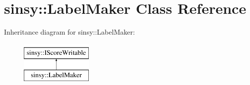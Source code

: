 \hypertarget{classsinsy_1_1LabelMaker}{\section{sinsy\-:\-:\-Label\-Maker \-Class \-Reference}
\label{classsinsy_1_1LabelMaker}
}
\-Inheritance diagram for sinsy\-:\-:\-Label\-Maker\-:\begin{figure}[H]
\begin{center}
\leavevmode
\includegraphics[height=2.000000cm]{classsinsy_1_1LabelMaker}
\end{center}
\end{figure}
